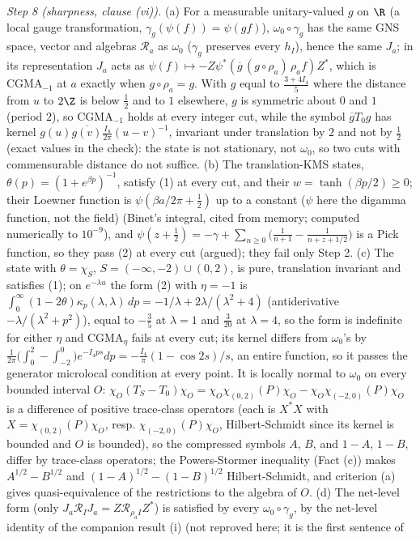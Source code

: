 \emph{Step 8 (sharpness, clause (vi)).} (a) For a measurable unitary-valued $g$ on $\R$ (a local gauge transformation, $\gamma_{g}(\psi(f)) = \psi(gf)$), $\omega_{0}\circ\gamma_{g}$ has the same GNS space, vector and algebras $\mathcal{R}_{a}$ as $\omega_{0}$ ($\gamma_{g}$ preserves every $h_{I}$), hence the same $J_{a}$; in its representation $J_{a}$ acts as $\psi(f) \mapsto -Z\psi^{*}(\overline{g}\,(g\circ\rho_{a})\,\rho_{a}f)Z^{*}$, which is CGMA$_{-1}$ at $a$ exactly when $g\circ\rho_{a} = g$. With $g$ equal to $\tfrac{3 + 4I_{4}}{5}$ where the distance from $u$ to $2\Z$ is below $\tfrac12$ and to $1$ elsewhere, $g$ is symmetric about $0$ and $1$ (period $2$), so CGMA$_{-1}$ holds at every integer cut, while the symbol $\overline{g}T_{0}g$ has kernel $g(u)\overline{g(v)}\tfrac{I_{4}}{2\pi}(u - v)^{-1}$, invariant under translation by $2$ and not by $\tfrac12$ (exact values in the check): the state is not stationary, not $\omega_{0}$, so two cuts with commensurable distance do not suffice. (b) The translation-KMS states, $\theta(p) = (1 + e^{\beta p})^{-1}$, satisfy (1) at every cut, and their $w = \tanh(\beta p/2) \ge 0$; their Loewner function is $\psi(\beta a/2\pi + \tfrac12)$ up to a constant ($\psi$ here the digamma function, not the field) (Binet's integral, cited from memory; computed numerically to $10^{-9}$), and $\psi(z + \tfrac12) = -\gamma + \sum_{n \ge 0}\big(\tfrac{1}{n + 1} - \tfrac{1}{n + z + 1/2}\big)$ is a Pick function, so they pass (2) at every cut (argued); they fail only Step 2. (c) The state with $\theta = \chi_{S}$, $S = (-\infty, -2)\cup(0, 2)$, is pure, translation invariant and satisfies (1); on $e^{-\lambda u}$ the form (2) with $\eta = -1$ is $\int_{0}^{\infty}(1 - 2\theta)\kappa_{p}(\lambda, \lambda)\,dp = -1/\lambda + 2\lambda/(\lambda^{2} + 4)$ (antiderivative $-\lambda/(\lambda^{2} + p^{2})$), equal to $-\tfrac35$ at $\lambda = 1$ and $\tfrac{3}{20}$ at $\lambda = 4$, so the form is indefinite for either $\eta$ and CGMA$_{\eta}$ fails at every cut; its kernel differs from $\omega_{0}$'s by $\tfrac{1}{2\pi}\big(\int_{0}^{2} - \int_{-2}^{0}\big)e^{-I_{4}ps}dp = -\tfrac{I_{4}}{\pi}(1 - \cos 2s)/s$, an entire function, so it passes the generator microlocal condition at every point. It is locally normal to $\omega_{0}$ on every bounded interval $O$: $\chi_{O}(T_{S} - T_{0})\chi_{O} = \chi_{O}\chi_{(0, 2)}(P)\chi_{O} - \chi_{O}\chi_{(-2, 0)}(P)\chi_{O}$ is a difference of positive trace-class operators (each is $X^{*}X$ with $X = \chi_{(0, 2)}(P)\chi_{O}$, resp. $\chi_{(-2, 0)}(P)\chi_{O}$, Hilbert-Schmidt since its kernel is bounded and $O$ is bounded), so the compressed symbols $A$, $B$, and $1 - A$, $1 - B$, differ by trace-class operators; the Powers-Stormer inequality (Fact (c)) makes $A^{1/2} - B^{1/2}$ and $(1 - A)^{1/2} - (1 - B)^{1/2}$ Hilbert-Schmidt, and criterion (a) gives quasi-equivalence of the restrictions to the algebra of $O$. (d) The net-level form (only $J_{a}\mathcal{R}_{I}J_{a} = Z\mathcal{R}_{\rho_{a}I}Z^{*}$) is satisfied by every $\omega_{0}\circ\gamma_{g}$, by the net-level identity of the companion result (i) (not reproved here; it is the first sentence of 